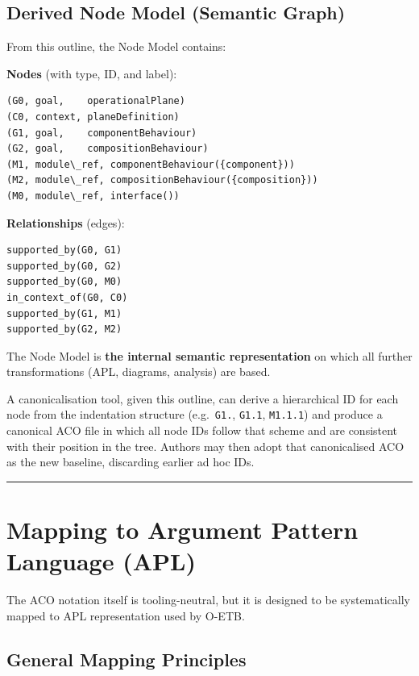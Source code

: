 \documentclass[11pt,twoside,a4paper]{article}
\begin{document}
\subsection{Derived Node Model (Semantic Graph)}

From this outline, the Node Model contains:

\textbf{Nodes} (with type, ID, and label):
\begin{verbatim}
(G0, goal,    operationalPlane)
(C0, context, planeDefinition)
(G1, goal,    componentBehaviour)
(G2, goal,    compositionBehaviour)
(M1, module\_ref, componentBehaviour({component}))
(M2, module\_ref, compositionBehaviour({composition}))
(M0, module\_ref, interface())
\end{verbatim}

\textbf{Relationships} (edges):
\begin{verbatim}
supported_by(G0, G1)
supported_by(G0, G2)
supported_by(G0, M0)
in_context_of(G0, C0)
supported_by(G1, M1)
supported_by(G2, M2)
\end{verbatim}

The Node Model is \textbf{the internal semantic representation} on which all further transformations (APL, diagrams, analysis) are based.

A canonicalisation tool, given this outline, can derive a hierarchical ID for each node from the indentation structure (e.g.\ \texttt{G1.}, \texttt{G1.1}, \texttt{M1.1.1}) and produce a canonical ACO file in which all node IDs follow that scheme and are consistent with their position in the tree. Authors may then adopt that canonicalised ACO as the new baseline, discarding earlier ad hoc IDs.

\bigskip
\hrule
\bigskip

\section{Mapping to Argument Pattern Language (APL)}

The ACO notation itself is tooling-neutral, but it is designed to be systematically mapped to APL representation used by O-ETB.

\subsection{General Mapping Principles}
\end{document}
